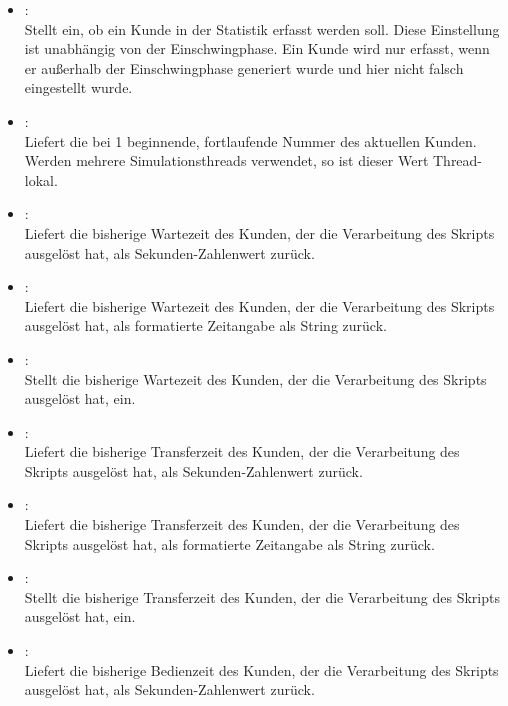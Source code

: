 \begin{itemize}
\item
{}:\\
Stellt ein, ob ein Kunde in der Statistik erfasst werden soll.
Diese Einstellung ist unabhängig von der Einschwingphase. Ein Kunde wird nur erfasst, wenn er außerhalb
der Einschwingphase generiert wurde und hier nicht falsch eingestellt wurde.
  
\item
{}:\\
Liefert die bei 1 beginnende, fortlaufende Nummer des aktuellen Kunden.
Werden mehrere Simulationsthreads verwendet, so ist dieser Wert Thread-lokal.
  
\item
{}:\\
Liefert die bisherige Wartezeit des Kunden, der die Verarbeitung des Skripts ausgelöst hat, als Sekunden-Zahlenwert zurück.
  
\item
{}:\\
Liefert die bisherige Wartezeit des Kunden, der die Verarbeitung des Skripts ausgelöst hat, als formatierte Zeitangabe als String zurück.
  
\item
{}:\\
Stellt die bisherige Wartezeit des Kunden, der die Verarbeitung des Skripts ausgelöst hat, ein.
  
\item
{}:\\
Liefert die bisherige Transferzeit des Kunden, der die Verarbeitung des Skripts ausgelöst hat, als Sekunden-Zahlenwert zurück.
  
\item
{}:\\
Liefert die bisherige Transferzeit des Kunden, der die Verarbeitung des Skripts ausgelöst hat, als formatierte Zeitangabe als String zurück.
  
\item
{}:\\
Stellt die bisherige Transferzeit des Kunden, der die Verarbeitung des Skripts ausgelöst hat, ein.
  
\item
{}:\\
Liefert die bisherige Bedienzeit des Kunden, der die Verarbeitung des Skripts ausgelöst hat, als Sekunden-Zahlenwert zurück.
  

\end{itemize}
